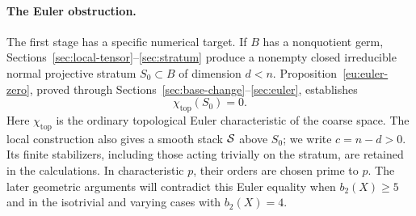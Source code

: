 \paragraph{The Euler obstruction.}
The first stage has a specific numerical target. If \(B\) has a
nonquotient germ, Sections~\ref{sec:local-tensor}--\ref{sec:stratum}
produce a nonempty closed irreducible normal projective stratum
\(S_0\subset B\) of dimension \(d<n\). Proposition~\ref{eu:euler-zero},
proved through Sections~\ref{sec:base-change}--\ref{sec:euler}, establishes
\[
                         \chi_{\mathrm{top}}(S_0)=0.
\]
Here \(\chi_{\mathrm{top}}\) is the ordinary topological Euler
characteristic of the coarse space. The local construction also gives a
smooth stack \(\mathcal S\) above \(S_0\); we write \(c=n-d>0\).
Its finite stabilizers, including those acting trivially on the stratum,
are retained in the calculations. In characteristic \(p\), their orders
are chosen prime to \(p\). The later geometric arguments will contradict
this Euler equality when \(b_2(X)\geq5\) and in the isotrivial and varying
cases with \(b_2(X)=4\).

